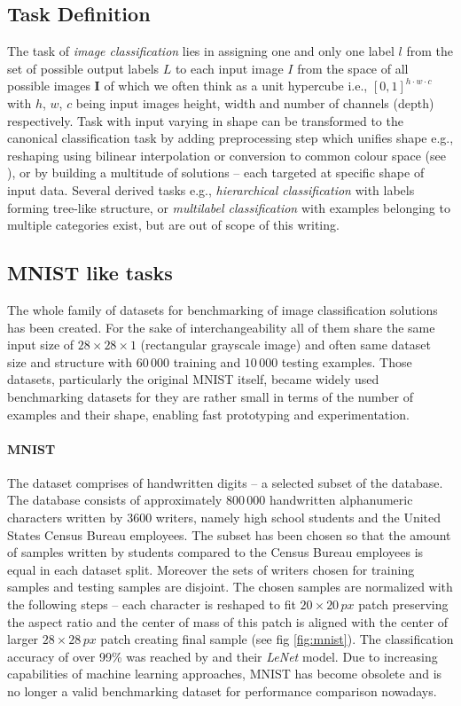 \subsection{Task Definition}
The task of \emph{image classification} lies in assigning one and only one label $l$ from the set of possible output labels $L$ to each input image $I$ from the space of all possible images $\mathbf{I}$ of which we often think as a unit hypercube i.e., $[0,1]^{h \cdot w \cdot c}$ with $h$, $w$, $c$ being input images height, width and number of channels (depth) respectively. Task with input varying in shape can be transformed to the canonical classification task by adding preprocessing step which unifies shape e.g., reshaping using bilinear interpolation or conversion to common colour space (see \cite{computer_vision}), or by building a multitude of solutions -- each targeted at specific shape of input data. Several derived tasks e.g., \emph{hierarchical classification} with labels forming tree-like structure, or \emph{multilabel classification} with examples belonging to multiple categories exist, but are out of scope of this writing.

\subsection{MNIST like tasks}
\label{subsec:mnist_tasks}
The whole family of datasets for benchmarking of image classification solutions has been created. For the sake of interchangeability all of them share the same input size of $28 \times 28 \times 1$ (rectangular grayscale image) and often same dataset size and structure with $60\,000$ training and $10\,000$ testing examples. Those datasets, particularly the original MNIST itself, became widely used benchmarking datasets for they are rather small in terms of the number of examples and their shape, enabling fast prototyping and experimentation.

\paragraph{MNIST}

The dataset comprises of handwritten digits -- a selected subset of the \cite{NIST_19} database. The database consists of approximately $800\,000$ handwritten alphanumeric characters written by 3600 writers, namely high school students and the United States Census Bureau employees. The subset has been chosen so that the amount of samples written by students compared to the Census Bureau employees is equal in each dataset split. Moreover the sets of writers chosen for training samples and testing samples are disjoint. The chosen samples are normalized with the following steps -- each character is reshaped to fit $20 \times 20\,px$ patch preserving the aspect ratio and the center of mass of this patch is aligned with the center of larger $28 \times 28\,px$ patch creating final sample (see fig \ref{fig:mnist}). The classification accuracy of over 99\% was reached by \cite{Lecun98gradient-basedlearning} and their \emph{LeNet} model. Due to increasing capabilities of machine learning approaches, MNIST has become obsolete and is no longer a valid benchmarking dataset for performance comparison nowadays.

